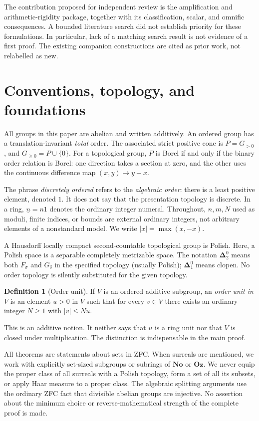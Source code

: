 \documentclass[11pt]{article}
\numberwithin{equation}{section}
\theoremstyle{definition}
\newtheorem{definition}[definition]{Definition}
\theoremstyle{remark}
\newcommand{\No}{\mathbf{No}}
\newcommand{\Oz}{\mathbf{Oz}}
\newcommand{\Dtwo}{\boldsymbol{\Delta}^{0}_{2}}
\newcommand{\Done}{\boldsymbol\Delta^0_1}
\newcommand{\std}[1]{\underline{#1}}
\begin{document}
The contribution proposed for independent review is the amplification and
arithmetic-rigidity package, together with its classification, scalar,
and omnific consequences. A bounded literature search did not establish
priority for these formulations. In particular, lack of a matching search
result is not evidence of a first proof. The existing companion constructions
are cited as prior work, not relabelled as new.

\section{Conventions, topology, and foundations}
\label{pma:lc:sec:conventions}

All groups in this paper are abelian and written additively. An ordered
group has a translation-invariant \emph{total} order. The associated
strict positive cone is $P=G_{>0}$, and $G_{\ge0}=P\cup\{0\}$.
For a topological group, $P$ is Borel if and only if the binary order
relation is Borel: one direction takes a section at zero, and the other
uses the continuous difference map $(x,y)\mapsto y-x$.

The phrase \emph{discretely ordered} refers to the \emph{algebraic order}:
there is a least positive element, denoted $1$. It does not say that the
presentation topology is discrete. In a ring, $\std n=n1$ denotes the
ordinary integer numeral. Throughout, $n,m,N$ used as moduli, finite
indices, or bounds are external ordinary integers, not arbitrary elements
of a nonstandard model. We write $|x|=\max(x,-x)$.

A Hausdorff locally compact second-countable topological group is Polish.
Here, a Polish space is a separable completely metrizable space. The
notation $\Dtwo$ means both $F_\sigma$ and $G_\delta$ in the specified
topology (usually Polish); $\Done$ means clopen. No order topology is silently
substituted for the given topology.

\begin{definition}[Order unit]
If $V$ is an ordered additive subgroup, an \emph{order unit in $V$} is an
 element $u>0$ in $V$ such that for every $v\in V$ there exists an ordinary
 integer $N\ge1$ with $|v|\le Nu$.
\end{definition}

This is an additive notion. It neither says that $u$ is a ring unit nor
that $V$ is closed under multiplication. The distinction is indispensable
in the main proof.

All theorems are statements about sets in ZFC. When surreals are mentioned,
we work with explicitly set-sized subgroups or subrings of $\No$ or $\Oz$.
We never equip the proper class of all surreals with a Polish topology,
form a set of all its subsets, or apply Haar measure to a proper class.
The algebraic splitting arguments use the ordinary ZFC fact that divisible
abelian groups are injective. No assertion about the minimum choice or
reverse-mathematical strength of the complete proof is made.
\end{document}
